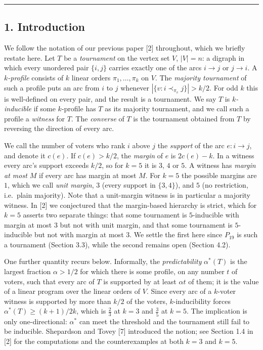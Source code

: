 \documentclass[
]{article}
\begin{document}
\begin{center}\rule{0.5\linewidth}{0.5pt}\end{center}

\subsection{1. Introduction}\label{introduction}

We follow the notation of our previous paper {[}2{]} throughout, which
we briefly restate here. Let \(T\) be a \emph{tournament} on the vertex
set \(V\), \(|V| = n\): a digraph in which every unordered pair
\(\{i,j\}\) carries exactly one of the arcs \(i \to j\) or \(j \to i\).
A \emph{\(k\)-profile} consists of \(k\) linear orders
\(\pi_1, \dots, \pi_k\) on \(V\). The \emph{majority tournament} of such
a profile puts an arc from \(i\) to \(j\) whenever
\(|\{ v : i \prec_{\pi_v} j \}| > k/2\). For odd \(k\) this is
well-defined on every pair, and the result is a tournament. We say \(T\)
is \emph{\(k\)-inducible} if some \(k\)-profile has \(T\) as its
majority tournament, and we call such a profile a \emph{witness} for
\(T\). The \emph{converse} of \(T\) is the tournament obtained from
\(T\) by reversing the direction of every arc.

We call the number of voters who rank \(i\) above \(j\) the
\emph{support} of the arc \(e: i \to j\), and denote it \(c(e)\). If
\(c(e) > k/2\), the \emph{margin} of \(e\) is \(2c(e) - k\). In a
witness every arc's support exceeds \(k/2\), so for \(k = 5\) it is
\(3\), \(4\) or \(5\). A witness has \emph{margin at most \(M\)} if
every arc has margin at most \(M\). For \(k = 5\) the possible margins
are \(1\), which we call \emph{unit margin}, \(3\) (every support in
\(\{3,4\}\)), and \(5\) (no restriction, i.e.~plain majority). Note that
a unit-margin witness is in particular a majority witness. In {[}2{]} we
conjectured that the margin-based hierarchy is strict, which for
\(k = 5\) asserts two separate things: that some tournament is
\(5\)-inducible with margin at most \(3\) but not with unit margin, and
that some tournament is \(5\)-inducible but not with margin at most
\(3\). We settle the first here since \(P_{19}\) is such a tournament
(Section 3.3), while the second remains open (Section 4.2).

One further quantity recurs below. Informally, the \emph{predictability}
\(\alpha^{*}(T)\) is the largest fraction \(\alpha > 1/2\) for which
there is some profile, on any number \(t\) of voters, such that every
arc of \(T\) is supported by at least \(\alpha t\) of them; it is the
value of a linear program over the linear orders of \(V\). Since every
arc of a \(k\)-voter witness is supported by more than \(k/2\) of the
voters, \(k\)-inducibility forces \(\alpha^{*}(T) \ge (k+1)/2k\), which
is \(\tfrac{2}{3}\) at \(k = 3\) and \(\tfrac{3}{5}\) at \(k = 5\). The
implication is only one-directional: \(\alpha^{*}\) can meet the
threshold and the tournament still fail to be inducible. Shepardson and
Tovey {[}7{]} introduced the notion; see Section 1.4 in {[}2{]} for the
computations and the counterexamples at both \(k = 3\) and \(k = 5\).
\end{document}

